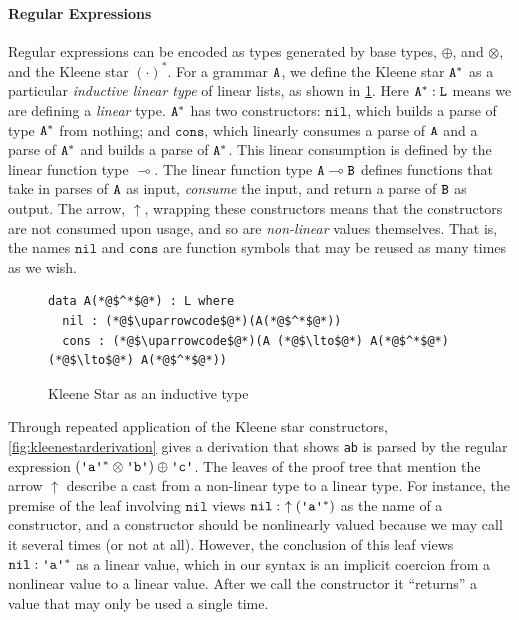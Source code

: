 \documentclass[acmsmall,nonacm]{acmart}
\newcommand{\uparrowcode}{\color{nonlinconstructorcolor} \uparrow}
\newcommand{\lto}{\multimap}
\newcommand{\ltonl}[1]{~\uparrow #1}
\newcommand{\nil}{\texttt{nil}}
\newcommand{\cons}{\texttt{cons}}
\newcommand{\literal}[1]{\texttt{\textquotesingle#1\textquotesingle}}
\newcommand{\stringquote}[1]{\texttt{\textquotedbl#1\textquotedbl}}
\begin{document}
\paragraph{Regular Expressions}
Regular expressions can be encoded as types generated by base types,
$\oplus$, and $\otimes$, and the Kleene star $(\cdot)^{\ast}$.  For a
grammar $\texttt{A}$, we define the Kleene star $\texttt{A}^{*}$ as a particular
\emph{inductive linear type} of linear lists, as shown in
\cref{fig:kleenestarinductive}. Here $\texttt{A}^{*} : \texttt{L}$ means we are defining
a \emph{linear} type. $\texttt{A}^{*}$ has two constructors: $\nil$, which
builds a parse of type $\texttt{A}^{*}$ from nothing; and $\cons$, which
linearly consumes a parse of $\texttt{A}$ and a parse of $\texttt{A}^{*}$ and builds a
parse of $\texttt{A}^{*}$. This linear consumption is defined by the linear
function type $\lto$. The linear function type $\A \lto \B$ defines functions that
take in parses of $\texttt{A}$ as input, \emph{consume} the input, and return a parse of
$\texttt{B}$ as output. The arrow, $\uparrow$, wrapping these
constructors means that the constructors are not consumed
upon usage, and so are \emph{non-linear} values themselves. That is, the
names $\nil$ and $\cons$ are function symbols that may be reused as many times
as we wish.

\begin{figure}
\begin{lstlisting}
data A(*@$^*$@*) : L where
  nil : (*@$\uparrowcode$@*)(A(*@$^*$@*))
  cons : (*@$\uparrowcode$@*)(A (*@$\lto$@*) A(*@$^*$@*) (*@$\lto$@*) A(*@$^*$@*))
\end{lstlisting}
\caption{Kleene Star as an inductive type}
\label{fig:kleenestarinductive}
\end{figure}

Through repeated application of the Kleene star constructors,
\cref{fig:kleenestarderivation} gives a derivation that shows
\stringquote{ab} is parsed by the regular expression $({\literal a}^{*}
\otimes \literal b) \oplus \literal c$. The leaves of the proof tree
that mention the arrow $\uparrow$ describe a cast from a non-linear
type to a linear type.  For instance, the premise of the leaf
involving $\nil$ views $\nil : \ltonl {({\literal a}^{*})}$ as the
name of a constructor, and a constructor should be nonlinearly valued
because we may call it several times (or not at all). However, the
conclusion of this leaf views $\nil : {\literal a}^{*}$ as a linear
value, which in our syntax is an implicit coercion from a nonlinear
value to a linear value. After we call the constructor it ``returns''
a value that may only be used a single time.
\end{document}
